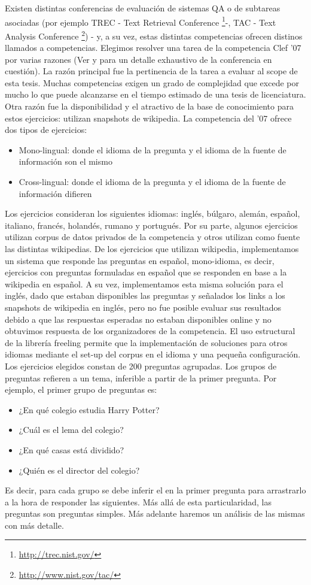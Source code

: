 Existen distintas conferencias de evaluación de sistemas QA o de subtareas asociadas (por ejemplo TREC - Text Retrieval Conference \footnote{\url{http://trec.nist.gov/}}-, TAC - Text Analysis Conference \footnote{\url{http://www.nist.gov/tac/}}) - y, a su vez, estas distintas competencias ofrecen distinos llamados a competencias. Elegimos resolver una tarea de la competencia Clef '07  por varias razones (Ver \cite{GuidelineClef07} y \cite{OverviewClef07} para un detalle exhaustivo de la conferencia en cuestión). La razón principal fue la pertinencia de la tarea a evaluar al scope de esta tesis. Muchas competencias exigen un grado de complejidad que excede por mucho lo que puede alcanzarse en el tiempo estimado de una tesis de licenciatura. 
Otra razón fue la disponibilidad y el atractivo de la base de conocimiento para estos ejercicios: utilizan snapshots de wikipedia. 
La competencia del '07 ofrece dos tipos de ejercicios:
\begin{itemize}
\item Mono-lingual: donde el idioma de la pregunta y el idioma de la fuente de información son el mismo
\item Cross-lingual: donde el idioma de la pregunta y el idioma de la fuente de información difieren
\end{itemize}
Los ejercicios consideran los siguientes idiomas: inglés, búlgaro, alemán, español, italiano, francés, holandés, rumano y portugués. Por su parte, algunos
ejercicios utilizan corpus de datos privados de la competencia y otros utilizan como fuente las distintas wikipedias. De los ejercicios que utilizan
wikipedia, implementamos un sistema que responde las preguntas en español, mono-idioma, es decir, ejercicios con preguntas formuladas en español que se responden en base a la wikipedia en español. A su vez, implementamos esta misma solución para el inglés, dado que estaban disponibles las preguntas y señalados los links a los snapshots de wikipedia en inglés, pero no fue posible evaluar sus resultados debido a que las respuestas esperadas no estaban disponibles online y no obtuvimos respuesta de los organizadores de la competencia. El uso estructural de la librería freeling permite que la implementación de soluciones para otros idiomas mediante el set-up del corpus en el idioma y una pequeña configuración. 
Los ejercicios elegidos constan de 200 preguntas agrupadas. Los grupos de preguntas refieren a un tema, inferible a partir de la primer pregunta.
Por ejemplo, el primer grupo de preguntas es:
\begin{itemize}
\item ¿En qué colegio estudia Harry Potter?
\item ¿Cuál es el lema del colegio?
\item ¿En qué casas está dividido?
\item ¿Quién es el director del colegio?
\end{itemize}
Es decir, para cada grupo se debe inferir el  en la primer pregunta para arrastrarlo a la hora de responder las siguientes. Más allá de esta particularidad,
las preguntas son preguntas simples. Más adelante haremos un análisis de las mismas con más detalle.


